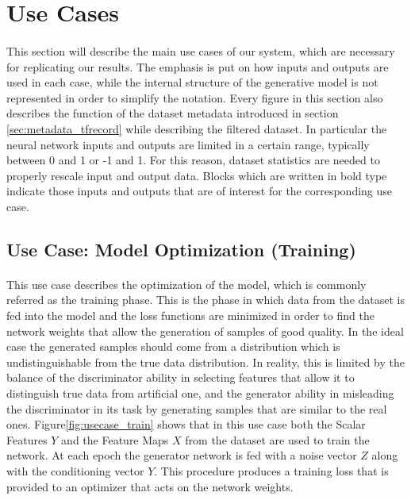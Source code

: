 \section{Use Cases}
\label{sec:usecases}
\paragraph{} This section will describe the main use cases of our system, which are necessary for replicating our results. The emphasis is put on how inputs and outputs are used in each case, while the internal structure of the generative model is not represented in order to simplify the notation. Every figure in this section also describes the function of the dataset metadata introduced in section \ref{sec:metadata_tfrecord} while describing the filtered dataset. In particular the neural network inputs and outputs are limited in a certain range, typically between 0 and 1 or -1 and 1. For this reason, dataset statistics are needed to properly rescale input and output data. Blocks which are written in bold type indicate those inputs and outputs that are of interest for the corresponding use case.

\subsection{Use Case: Model Optimization (Training)}
\label{sec:usecase_train}
\paragraph{} This use case describes the optimization of the model, which is commonly referred as the training phase. This is the phase in which data from the dataset is fed into the model and the loss functions are minimized in order to find the network weights that allow the generation of samples of good quality. In the ideal case the generated samples should come from a distribution which is undistinguishable from the true data distribution. In reality, this is limited by the balance of the discriminator ability in selecting features that allow it to distinguish true data from artificial one, and the generator ability in misleading the discriminator in its task by generating samples that are similar to the real ones. Figure\ref{fig:usecase_train} shows that in this use case both the Scalar Features $Y$ and the Feature Maps $X$ from the dataset are used to train the network. At each epoch the generator network is fed with a noise vector $Z$ along with the conditioning vector $Y$. This procedure produces a training loss that is provided to an optimizer that acts on the network weights. 

